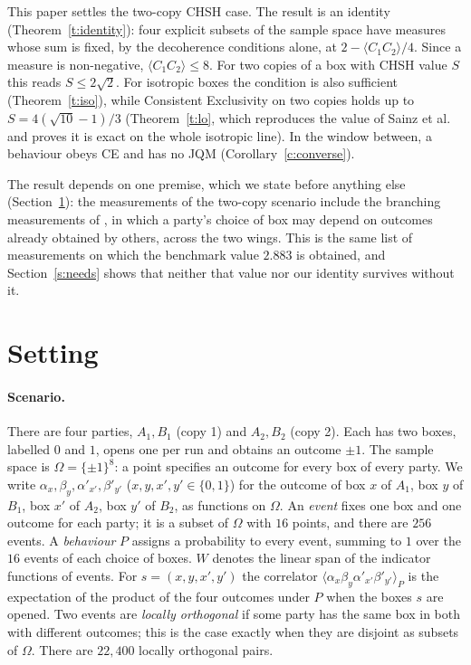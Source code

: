 \documentclass[11pt,a4paper]{article}
\theoremstyle{definition}
\theoremstyle{remark}
\newcommand{\ev}[1]{\langle #1\rangle_P}
\begin{document}
This paper settles the two-copy CHSH case. The result is an identity (Theorem~\ref{t:identity}): four
explicit subsets of the sample space have measures whose sum is fixed, by the decoherence conditions
alone, at $2-\langle C_1C_2\rangle/4$. Since a measure is non-negative, $\langle C_1C_2\rangle\le 8$.
For two copies of a box with CHSH value $S$ this reads $S\le 2\sqrt2$. For isotropic boxes the condition
is also sufficient (Theorem~\ref{t:iso}), while Consistent Exclusivity on two copies holds up to
$S=4(\sqrt{10}-1)/3$ (Theorem~\ref{t:lo}, which reproduces the value of Sainz et al.\ \cite{Sainz} and
proves it is exact on the whole isotropic line). In the window between, a behaviour obeys CE and has no
JQM (Corollary~\ref{c:converse}).

The result depends on one premise, which we state before anything else (Section~\ref{s:setting}): the
measurements of the two-copy scenario include the branching measurements of \cite{DHW}, in which a
party's choice of box may depend on outcomes already obtained by others, across the two wings. This is
the same list of measurements on which the benchmark value $2.883$ is obtained, and
Section~\ref{s:needs} shows that neither that value nor our identity survives without it.

\section{Setting}\label{s:setting}

\paragraph{Scenario.} There are four parties, $A_1,B_1$ (copy 1) and $A_2,B_2$ (copy 2). Each has two
boxes, labelled $0$ and $1$, opens one per run and obtains an outcome $\pm1$. The sample space is
$\Omega=\{\pm1\}^8$: a point specifies an outcome for every box of every party. We write
$\alpha_x,\beta_y,\alpha'_{x'},\beta'_{y'}$ ($x,y,x',y'\in\{0,1\}$) for the outcome of box $x$ of $A_1$,
box $y$ of $B_1$, box $x'$ of $A_2$, box $y'$ of $B_2$, as functions on $\Omega$. An \emph{event} fixes
one box and one outcome for each party; it is a subset of $\Omega$ with $16$ points, and there are
$256$ events. A \emph{behaviour} $P$ assigns a probability to every event, summing to $1$ over the $16$
events of each choice of boxes. $W$ denotes the linear span of the indicator functions of events. For
$s=(x,y,x',y')$ the correlator $\ev{\alpha_x\beta_y\alpha'_{x'}\beta'_{y'}}$ is the expectation of the
product of the four outcomes under $P$ when the boxes $s$ are opened. Two events are \emph{locally orthogonal} if some party has the same box
in both with different outcomes; this is the case exactly when they are disjoint as subsets of $\Omega$.
There are $22{,}400$ locally orthogonal pairs.
\end{document}
